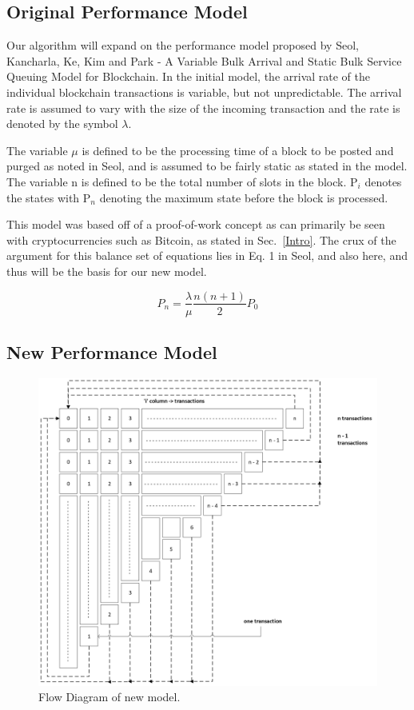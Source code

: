 \documentclass[conference]{IEEEtran}
\begin{document}
\subsection{Original Performance Model}\label{Model}
Our algorithm will expand on the performance model proposed by Seol, Kancharla, Ke, Kim and Park
 - A Variable Bulk Arrival and Static Bulk Service Queuing Model for Blockchain\cite{2020_ACM_Seol}. 
 In the initial model, the arrival rate of the individual blockchain transactions is variable, but not unpredictable. 
 The arrival rate is assumed to vary with the size of the incoming transaction and the rate is 
 denoted by the symbol $\lambda$.

The variable $\mu$ is defined to be the processing time of a block to be posted and purged as noted 
in Seol\cite{2020_ACM_Seol}, and is assumed to be fairly static as stated in the model. 
The variable n is defined to be the total number of slots in the block. P$_i$ denotes the states with 
P$_n$ denoting the maximum state before the block is processed. 

This model was based off of a proof-of-work concept as can primarily be seen with cryptocurrencies 
such as Bitcoin, as stated in Sec.~\ref{Intro}. The crux of the argument for this balance set of equations 
lies in Eq. 1 in Seol\cite{2020_ACM_Seol}, and also here, and thus will be the basis for our 
new model. 

\begin{equation}
P_n = \frac{\lambda}{\mu}\frac{n(n+1)}{2}P_0\label{om_1}
\end{equation}

\subsection{New Performance Model}\label{new_model}

\begin{figure}[htbp]
    \centerline{\includegraphics[width=\textwidth]{Figures/FlowDiagram.png}}
    \caption{Flow Diagram of new model.} 
    \label{flow}
\end{figure}	
\end{document}
